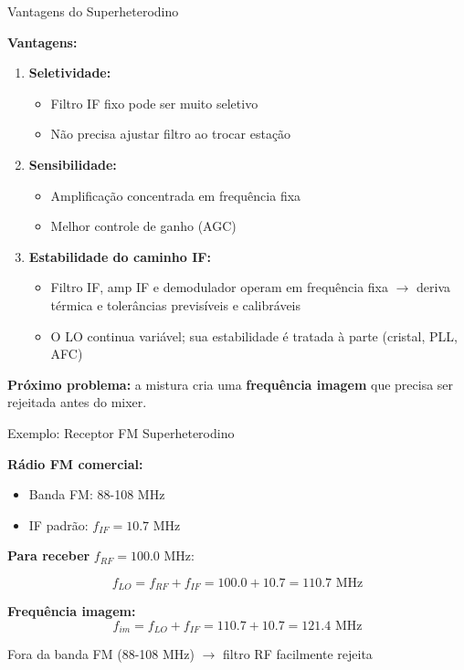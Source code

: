 
\begin{frame}{Vantagens do Superheterodino}

\textbf{Vantagens:}

\begin{enumerate}
\item \textbf{Seletividade:}
   \begin{itemize}
   \item Filtro IF fixo pode ser muito seletivo
   \item Não precisa ajustar filtro ao trocar estação
   \end{itemize}

\item \textbf{Sensibilidade:}
   \begin{itemize}
   \item Amplificação concentrada em frequência fixa
   \item Melhor controle de ganho (AGC)
   \end{itemize}

\item \textbf{Estabilidade do caminho IF:}
   \begin{itemize}
   \item Filtro IF, amp IF e demodulador operam em frequência fixa $\to$ deriva térmica e tolerâncias previsíveis e calibráveis
   \item O LO continua variável; sua estabilidade é tratada à parte (cristal, PLL, AFC)
   \end{itemize}
\end{enumerate}

\textbf{Próximo problema:} a mistura cria uma \textbf{frequência imagem} que precisa ser rejeitada antes do mixer.

\end{frame}


\begin{frame}{Exemplo: Receptor FM Superheterodino}

\textbf{Rádio FM comercial:}

\begin{itemize}
\item Banda FM: 88-108 MHz
\item IF padrão: $f_{IF} = 10.7$ MHz
\end{itemize}

\textbf{Para receber} $f_{RF} = 100.0$ MHz:

\[
f_{LO} = f_{RF} + f_{IF} = 100.0 + 10.7 = 110.7 \text{ MHz}
\]

\textbf{Frequência imagem:}
\[
f_{im} = f_{LO} + f_{IF} = 110.7 + 10.7 = 121.4 \text{ MHz}
\]

Fora da banda FM (88-108 MHz) $\rightarrow$ filtro RF facilmente rejeita

\end{frame}

